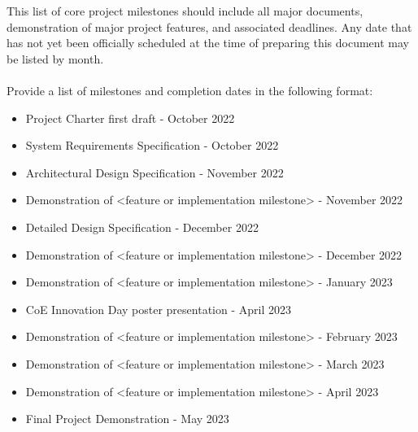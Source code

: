 This list of core project milestones should include all major documents, demonstration of major project features, and associated deadlines. Any date that has not yet been officially scheduled at the time of preparing this document may be listed by month.
\\
\\
Provide a list of milestones and completion dates in the following format:
\begin{itemize}
  \item Project Charter first draft - October 2022
  \item System Requirements Specification - October 2022
  \item Architectural Design Specification - November 2022
  \item Demonstration of <feature or implementation milestone> - November 2022
  \item Detailed Design Specification - December 2022
  \item Demonstration of <feature or implementation milestone> - December 2022
  \item Demonstration of <feature or implementation milestone> - January 2023
  \item CoE Innovation Day poster presentation - April 2023
  \item Demonstration of <feature or implementation milestone> - February 2023
  \item Demonstration of <feature or implementation milestone> - March 2023
  \item Demonstration of <feature or implementation milestone> - April 2023
  \item Final Project Demonstration - May 2023
\end{itemize}
